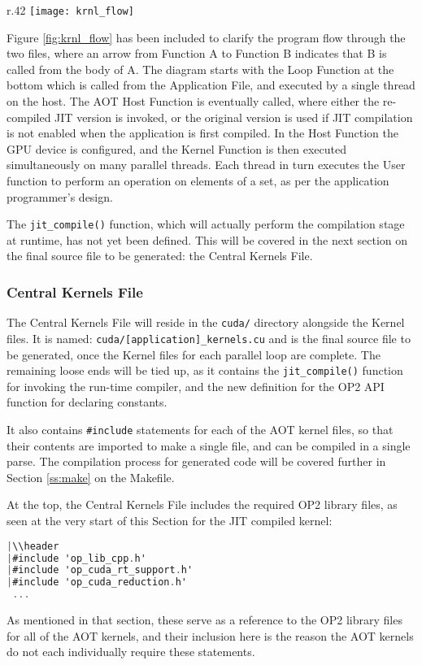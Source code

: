 \begin{wrapfigure}{r}{.42\textwidth}
  \centering
  \texttt{[image: krnl\_flow]}
  \caption{Kernel Flow}
  \label{fig:krnl_flow}
\end{wrapfigure}

Figure \ref{fig:krnl_flow} has been included to clarify the program flow through the two files, where an arrow from Function A to Function B indicates that B is called from the body of A. The diagram starts with the Loop Function at the bottom which is called from the Application File, and executed by a single thread on the host. The AOT Host Function is eventually called, where either the re-compiled JIT version is invoked, or the original version is used if JIT compilation is not enabled when the application is first compiled. In the Host Function the GPU device is configured, and the Kernel Function is then executed simultaneously on many parallel threads. Each thread in turn executes the User function to perform an operation on elements of a set, as per the application programmer's design.

The \verb|jit_compile()| function, which will actually perform the compilation stage at runtime, has not yet been defined. This will be covered in the next section on the final source file to be generated: the Central Kernels File.
\clearpage
\subsubsection{Central Kernels File}
\label{sss:mkf}
The Central Kernels File will reside in the \verb|cuda/| directory alongside the Kernel files. It is named: \verb|cuda/[application]_kernels.cu| and is the final source file to be generated, once the Kernel files for each parallel loop are complete. The remaining loose ends will be tied up, as it contains the \verb|jit_compile()| function for invoking the run-time compiler, and the new definition for the OP2 API function for declaring constants.
\par It also contains \verb|#include| statements for each of the AOT kernel files, so that their contents are imported to make a single file, and can be compiled in a single parse. The compilation process for generated code will be covered further in Section \ref{ss:make} on the Makefile.
\par
At the top, the Central Kernels File includes the required OP2 library files, as seen at the very start of this Section for the JIT compiled kernel:
\begin{lstlisting}[backgroundcolor = \color{red!20}, language=C]
|\\header
|#include 'op_lib_cpp.h'
|#include 'op_cuda_rt_support.h'
|#include 'op_cuda_reduction.h'
 ...
\end{lstlisting}
\noindent As mentioned in that section, these serve as a reference to the OP2 library files for all of the AOT kernels, and their inclusion here is the reason the AOT kernels do not each individually require these statements.


